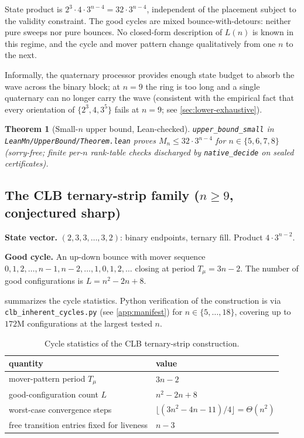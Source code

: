 \documentclass[11pt,a4paper]{article}
\theoremstyle{plain}
\newtheorem{theorem}{Theorem}
\theoremstyle{definition}
\newcommand{\Mn}{M_n}
\begin{document}
State product is $2^3 \cdot 4 \cdot 3^{n-4} = 32 \cdot 3^{n-4}$,
independent of the placement subject to the validity constraint.
The good cycles are mixed bounce-with-detours: neither pure sweeps nor
pure bounces.  No closed-form description of $L(n)$ is known in this
regime, and the cycle and mover pattern change qualitatively from one
$n$ to the next.

Informally, the quaternary processor provides enough state budget to
absorb the wave across the binary block; at $n = 9$ the ring is too
long and a single quaternary can no longer carry the wave (consistent
with the empirical fact that every orientation of $\{2^3, 4, 3^5\}$
fails at $n = 9$; see \cref{sec:lower-exhaustive}).

\begin{theorem}[Small-$n$ upper bound, Lean-checked]\label{thm:upper-bound-small}
\texttt{upper\_bound\_small} in \texttt{LeanMn/UpperBound/Theorem.lean}
proves $\Mn \le 32 \cdot 3^{n-4}$ for $n \in \{5, 6, 7, 8\}$
(sorry-free; finite per-$n$ rank-table checks discharged by
\texttt{native\_decide} on sealed certificates).
\end{theorem}

\subsection{The CLB ternary-strip family ($n \ge 9$, conjectured sharp)}\label{sec:upper-clb}

\textbf{State vector.} $(2, 3, 3, \ldots, 3, 2)$: binary endpoints,
ternary fill.  Product $4 \cdot 3^{n-2}$.

\textbf{Good cycle.} An up-down bounce with mover sequence
$0, 1, 2, \ldots, n-1, n-2, \ldots, 1, 0, 1, 2, \ldots$ closing at
period $T_\mu = 3n - 2$.  The number of good configurations is
$L = n^2 - 2n + 8$.

 summarizes the cycle statistics.  Python
verification of the construction is via
\texttt{clb\_inherent\_cycles.py} (see \cref{app:manifest}) for
$n \in \{5, \ldots, 18\}$, covering up to $172$M configurations at
the largest tested $n$.

\begin{table}[ht]
\centering
\caption{Cycle statistics of the CLB ternary-strip construction.}\label{tab:clb-stats}
\begin{tabular}{l l}
\toprule
quantity & value\\\midrule
mover-pattern period $T_\mu$ & $3n - 2$\\
good-configuration count $L$ & $n^2 - 2n + 8$\\
worst-case convergence steps & $\lfloor (3n^2 - 4n - 11)/4 \rfloor = \Theta(n^2)$\\
free transition entries fixed for liveness & $n - 3$\\
\bottomrule
\end{tabular}
\end{table}
\end{document}

